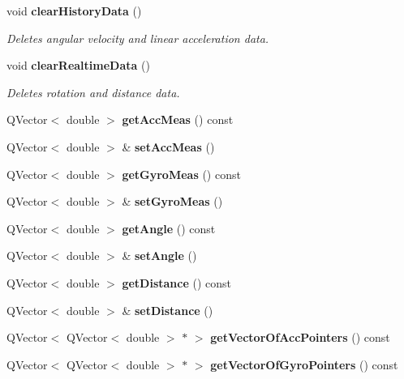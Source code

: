 \begin{DoxyCompactItemize}
void \textbf{ clear\+History\+Data} ()
\begin{DoxyCompactList}\small\item\em Deletes angular velocity and linear acceleration data. \end{DoxyCompactList}\item 
void \textbf{ clear\+Realtime\+Data} ()
\begin{DoxyCompactList}\small\item\em Deletes rotation and distance data. \end{DoxyCompactList}\item 
Q\+Vector$<$ double $>$ \textbf{ get\+Acc\+Meas} () const
\item 
Q\+Vector$<$ double $>$ \& \textbf{ set\+Acc\+Meas} ()
\item 
Q\+Vector$<$ double $>$ \textbf{ get\+Gyro\+Meas} () const
\item 
Q\+Vector$<$ double $>$ \& \textbf{ set\+Gyro\+Meas} ()
\item 
Q\+Vector$<$ double $>$ \textbf{ get\+Angle} () const
\item 
Q\+Vector$<$ double $>$ \& \textbf{ set\+Angle} ()
\item 
Q\+Vector$<$ double $>$ \textbf{ get\+Distance} () const
\item 
Q\+Vector$<$ double $>$ \& \textbf{ set\+Distance} ()
\item 
Q\+Vector$<$ Q\+Vector$<$ double $>$ $\ast$ $>$ \textbf{ get\+Vector\+Of\+Acc\+Pointers} () const
\item 
Q\+Vector$<$ Q\+Vector$<$ double $>$ $\ast$ $>$ \textbf{ get\+Vector\+Of\+Gyro\+Pointers} () const
\end{DoxyCompactItemize}
